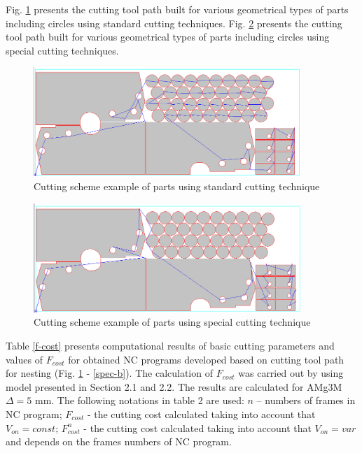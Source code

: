 \documentclass[runningheads]{llncs}
\begin{document}
Fig. \ref{std} presents the cutting tool path
built for various geometrical types of parts including circles using standard cutting techniques.
Fig. \ref{special} presents the cutting tool path built for various geometrical types of parts
including circles using special cutting techniques.

\begin{figure}
  \begin{center}
  \includegraphics[width=0.9\textwidth]{std.png}
  \caption{Cutting scheme example of parts using standard cutting technique}
  \label{std}
  \end{center}
\end{figure}

\begin{figure}
  \begin{center}
  \includegraphics[width=0.9\textwidth]{special.png}
  \caption{Cutting scheme example of parts using special cutting technique}
  \label{special}
  \end{center}
\end{figure}

Table \ref{f-cost} presents computational results of basic cutting parameters and values of $F_{cost}$
for obtained NC programs developed based on cutting tool path for nesting
(Fig. \ref{std} - \ref{spec-b}).
The calculation of $F_{cost}$
was carried out by using model presented in Section 2.1 and 2.2.
The results are calculated for AMg3M $\Delta = 5$ mm.
The following notations in table 2 are used:
$n$ – numbers of frames in NC program;
$F_{cost}$ - the cutting cost calculated taking into account that $V_{on}=const$;
$F^n_{cost}$ - the cutting cost calculated taking into account that $V_{on}=var$  and depends on the frames numbers of NC program.
\end{document}

